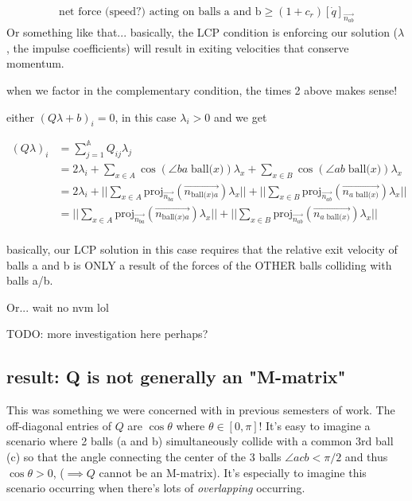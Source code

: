 \documentclass[12pt]{article}
\newcommand{\bigA}{{\mathbb{A}}}
\newcommand{\ball}[1]{\text{ball(} #1 \text{)}}
\newcommand{\proj}[2]{\text{proj}_{#1}(#2)}
\begin{document}
\begin{align*}
    \text{net force (speed?) acting on balls a and b} \geq (1 + c_r) [\dot{q}]_{\overrightarrow{n_{ab}}}
\end{align*}
\newline{}
Or something like that... basically, the LCP condition is enforcing our solution ($\lambda$,
the impulse coefficients) will result in exiting velocities that conserve momentum.


when we factor in the complementary condition, the times 2 above makes sense!

either $(Q\lambda + b)_i = 0$, in this case $\lambda_i > 0$ and we get

\begin{align*}
(Q \lambda)_i &= \sum_{j = 1}^{\bigA} Q_{ij} \lambda_j\\
    &= 2\lambda_i + \sum_{x \in A}^{} \cos(\angle ba\;\ball{x})\lambda_x + \sum_{x \in B}^{} \cos(\angle ab\;\ball{x})\lambda_x\\
    &= 2\lambda_i
        + ||\sum_{x \in A}^{}\proj{\overrightarrow{n_{ba}}}{\overrightarrow{n_{\ball{x}a}}} \lambda_x||
        + ||\sum_{x \in B}^{}\proj{\overrightarrow{n_{ab}}}{\overrightarrow{n_{a\;\ball{x}}}} \lambda_x||\\
    &= ||\sum_{x \in A}^{}\proj{\overrightarrow{n_{ba}}}{\overrightarrow{n_{\ball{x}a}}} \lambda_x||
        + ||\sum_{x \in B}^{}\proj{\overrightarrow{n_{ab}}}{\overrightarrow{n_{a\;\ball{x}}}} \lambda_x||\\
\end{align*}

basically, our LCP solution in this case requires that the relative exit velocity of balls
a and b is ONLY a result of the forces of the OTHER balls colliding with balls a/b.

Or... wait no nvm lol

TODO: more investigation here perhaps?

\subsection{result: Q is not generally an "M-matrix"}

This was something we were concerned with in previous semesters of work.
The off-diagonal entries of $Q$ are $\cos \theta$ where $\theta \in [0, \pi]$!
It's easy to imagine a scenario where 2 balls (a and b) 
simultaneously collide with a common 3rd ball (c) so that the angle
connecting the center of the 3 balls $\angle acb < \pi / 2$
and thus $\cos \theta > 0$, ($\implies Q$ cannot be an M-matrix).
It's especially to imagine this scenario occurring when there's lots of \textit{overlapping} occurring.
\end{document}
